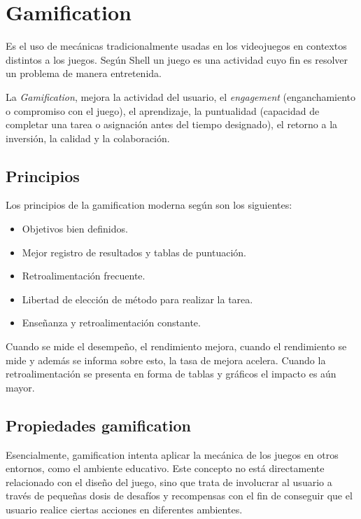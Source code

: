 \section{Gamification}
\label{sec:tics_GAMIFICATION}

Es el uso de mecánicas tradicionalmente usadas en los videojuegos en contextos
distintos a los juegos. Según Shell \cite{hj:gamification} un juego es una
actividad cuyo fin es resolver un problema de manera entretenida. 

La \emph{Gamification}, mejora la actividad del usuario, el \emph{engagement}
(enganchamiento o compromiso con el juego), el aprendizaje, la puntualidad
(capacidad de completar una tarea o asignación antes del tiempo designado), el
retorno a la inversión, la calidad y la colaboración.

\subsection{Principios}

Los principios de la gamification moderna según \cite{hj:gamification} son los
siguientes:

\begin{itemize}
\item Objetivos bien definidos.
\item Mejor registro de resultados y tablas de puntuación.
\item Retroalimentación frecuente.
\item Libertad de elección de método para realizar la tarea.
\item Enseñanza y retroalimentación constante.
\end{itemize}

Cuando se mide el desempeño, el rendimiento mejora, cuando el rendimiento se
mide y además se informa sobre esto, la tasa de mejora acelera. Cuando la
retroalimentación se presenta en forma de tablas y gráficos el impacto es aún
mayor.

\subsection{Propiedades gamification}

Esencialmente, gamification intenta aplicar la mecánica de los juegos en otros
entornos, como el ambiente educativo. Este concepto no está directamente
relacionado con el diseño del juego, sino que trata de involucrar al usuario a
través de pequeñas dosis de desafíos y recompensas con el fin de conseguir que
el usuario realice ciertas acciones en diferentes
ambientes\cite{breaking:gamification}.

